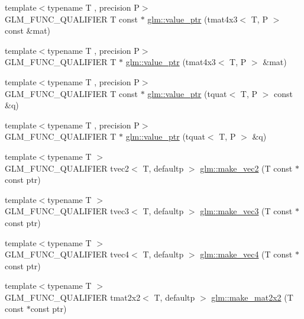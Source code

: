 \begin{DoxyCompactItemize}
\item 
{\footnotesize template$<$typename T , precision P$>$ }\\G\+L\+M\+\_\+\+F\+U\+N\+C\+\_\+\+Q\+U\+A\+L\+I\+F\+I\+ER T const  $\ast$ \hyperlink{group__gtc__type__ptr_ga72b0a496d6c190645accac32f48f64bb}{glm\+::value\+\_\+ptr} (tmat4x3$<$ T, P $>$ const \&mat)
\item 
{\footnotesize template$<$typename T , precision P$>$ }\\G\+L\+M\+\_\+\+F\+U\+N\+C\+\_\+\+Q\+U\+A\+L\+I\+F\+I\+ER T $\ast$ \hyperlink{group__gtc__type__ptr_gab9cba81cd8a7eb0afc9ac2b9f4fe05ca}{glm\+::value\+\_\+ptr} (tmat4x3$<$ T, P $>$ \&mat)
\item 
{\footnotesize template$<$typename T , precision P$>$ }\\G\+L\+M\+\_\+\+F\+U\+N\+C\+\_\+\+Q\+U\+A\+L\+I\+F\+I\+ER T const  $\ast$ \hyperlink{group__gtc__type__ptr_ga26a38ff14840b35c57fa937711c5168c}{glm\+::value\+\_\+ptr} (tquat$<$ T, P $>$ const \&q)
\item 
{\footnotesize template$<$typename T , precision P$>$ }\\G\+L\+M\+\_\+\+F\+U\+N\+C\+\_\+\+Q\+U\+A\+L\+I\+F\+I\+ER T $\ast$ \hyperlink{group__gtc__type__ptr_ga637414d7a9e8877e66a59f3b3d700898}{glm\+::value\+\_\+ptr} (tquat$<$ T, P $>$ \&q)
\item 
{\footnotesize template$<$typename T $>$ }\\G\+L\+M\+\_\+\+F\+U\+N\+C\+\_\+\+Q\+U\+A\+L\+I\+F\+I\+ER tvec2$<$ T, defaultp $>$ \hyperlink{group__gtc__type__ptr_ga5f7393c30970c5949be13ceb525093a6}{glm\+::make\+\_\+vec2} (T const $\ast$const ptr)
\item 
{\footnotesize template$<$typename T $>$ }\\G\+L\+M\+\_\+\+F\+U\+N\+C\+\_\+\+Q\+U\+A\+L\+I\+F\+I\+ER tvec3$<$ T, defaultp $>$ \hyperlink{group__gtc__type__ptr_ga86f4bc63570db86346db2e567fb760f6}{glm\+::make\+\_\+vec3} (T const $\ast$const ptr)
\item 
{\footnotesize template$<$typename T $>$ }\\G\+L\+M\+\_\+\+F\+U\+N\+C\+\_\+\+Q\+U\+A\+L\+I\+F\+I\+ER tvec4$<$ T, defaultp $>$ \hyperlink{group__gtc__type__ptr_ga152345176b8951c15711f6ed4f6fc237}{glm\+::make\+\_\+vec4} (T const $\ast$const ptr)
\item 
{\footnotesize template$<$typename T $>$ }\\G\+L\+M\+\_\+\+F\+U\+N\+C\+\_\+\+Q\+U\+A\+L\+I\+F\+I\+ER tmat2x2$<$ T, defaultp $>$ \hyperlink{group__gtc__type__ptr_gadb29e510762e1042069cb28bf24ae990}{glm\+::make\+\_\+mat2x2} (T const $\ast$const ptr)

\end{DoxyCompactItemize}

